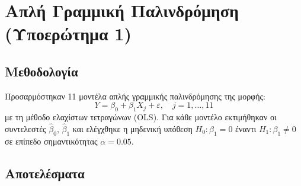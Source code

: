 \documentclass[12pt,a4paper]{article}
\begin{document}
\section{Απλή Γραμμική Παλινδρόμηση (Υποερώτημα 1)}

\subsection{Μεθοδολογία}

Προσαρμόστηκαν 11 μοντέλα απλής γραμμικής παλινδρόμησης της μορφής:
\begin{equation}
    Y = \beta_0 + \beta_1 X_j + \varepsilon, \quad j = 1, \ldots, 11
\end{equation}
με τη μέθοδο ελαχίστων τετραγώνων (OLS). Για κάθε μοντέλο εκτιμήθηκαν οι συντελεστές $\hat{\beta}_0$, $\hat{\beta}_1$ και ελέγχθηκε η μηδενική υπόθεση $H_0: \beta_1 = 0$ έναντι $H_1: \beta_1 \neq 0$ σε επίπεδο σημαντικότητας $\alpha = 0.05$.

\subsection{Αποτελέσματα}
\end{document}
